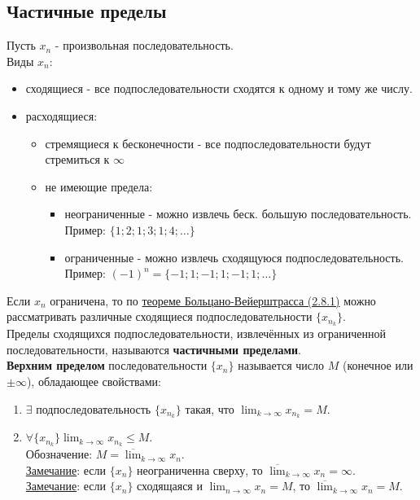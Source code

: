 \documentclass[12pt]{article}
\begin{document}
    \subsection{Частичные пределы}
    \noindent Пусть $x_n$ - произвольная последовательность.\\
    Виды $x_n$:
    \begin{itemize}
        \item сходящиеся - все подпоследовательности сходятся к одному и тому же числу.
        \item расходящиеся:
              \begin{itemize}
                \item стремящиеся к бесконечности - все подпоследовательности будут стремиться к $\infty$
                \item не имеющие предела:
                      \begin{itemize}
                        \item неограниченные - можно извлечь беск. большую последовательность.\\Пример: $\{1; 2; 1; 3; 1; 4; \dots\}$
                        \item ограниченные - можно извлечь сходящуюся подпоследовательность.\\Пример: $(-1)^n = \{-1; 1; -1; 1; -1; 1; \dots\}$
                      \end{itemize}
              \end{itemize}
    \end{itemize}
    Если $x_n$ ограничена, то по \hyperref[th:2.8.1]{теореме Больцано-Вейерштрасса (2.8.1)} можно рассматривать различные сходящиеся подпоследовательности $\{x_{n_{k}}\}$.\\
    Пределы сходящихся подпоследовательности, извлечённых из ограниченной последовательности, называются \textbf{частичными пределами}.\\
    \textbf{Верхним пределом} последовательности $\{x_n\}$ называется число $M$ (конечное или $\pm \infty$), обладающее свойствами:
    \begin{enumerate}
        \item $\exists$ подпоследовательность $\{x_{n_{k}}\}$ такая, что $\lim_{k\to\infty}x_{n_{k}} = M$.
        \item $\forall \{x_{n_{k}}\} \lim_{k\to\infty} x_{n_{k}} \le M$.\\
        Обозначение: $M = \overline{\lim}_{k\to\infty}x_n$.\\
        \underline{Замечание}: если $\{x_n\}$ неограниченна сверху, то $\overline{\lim}_{k\to\infty}x_n = \infty$.\\
        \underline{Замечание}: если $\{x_n\}$ сходящаяся и $\lim_{n\to\infty} x_n = M$, то $\overline{\lim}_{k\to\infty}x_n = M$.
    \end{enumerate}
\end{document}
